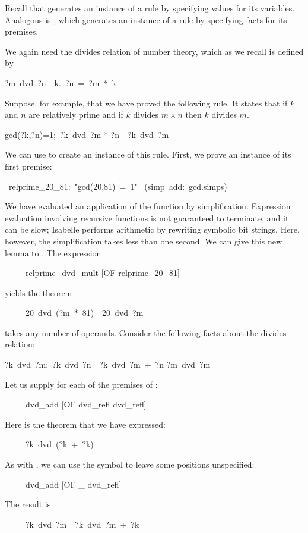 %
Recall that  generates an instance of a
rule by specifying values for its variables.  Analogous is , which
generates an instance of a rule by specifying facts for its premises.  

We again need the divides relation of number theory, which
as we recall is defined by 
\begin{isabelle}
?m\ dvd\ ?n\ \isasymequiv\ {\isasymexists}k.\ ?n\ =\ ?m\ *\ k
\end{isabelle}
%
Suppose, for example, that we have proved the following rule.  
It states that if $k$ and $n$ are relatively prime
and if $k$ divides $m\times n$ then $k$ divides $m$.
\begin{isabelle}
\isasymlbrakk gcd(?k,?n){=}1;\ ?k\ dvd\ ?m * ?n\isasymrbrakk\
\isasymLongrightarrow\ ?k\ dvd\ ?m
\end{isabelle}
We can use  to create an instance of this rule.
First, we
prove an instance of its first premise:
\begin{isabelle}
\ relprime_20_81:\ "gcd(20,81)\ =\ 1"\isanewline
\isacommand{by}\ (simp\ add:\ gcd.simps)
\end{isabelle}
We have evaluated an application of the  function by
simplification.  Expression evaluation involving recursive functions is not
guaranteed to terminate, and it can be slow; Isabelle
performs arithmetic by  rewriting symbolic bit strings.  Here,
however, the simplification takes less than one second.  We can
give this new lemma to .  The expression
\begin{isabelle}
\ \ \ \ \ relprime_dvd_mult [OF relprime_20_81]
\end{isabelle}
yields the theorem
\begin{isabelle}
\ \ \ \ \ 20\ dvd\ (?m\ *\ 81)\ \isasymLongrightarrow\ 20\ dvd\ ?m%
\end{isabelle}
%
 takes any number of operands.  Consider 
the following facts about the divides relation: 
\begin{isabelle}
\isasymlbrakk?k\ dvd\ ?m;\
?k\ dvd\ ?n\isasymrbrakk\
\isasymLongrightarrow\ ?k\ dvd\
?m\ +\ ?n
\rulename{dvd_add}\isanewline
?m\ dvd\ ?m%
\rulename{dvd_refl}
\end{isabelle}
Let us supply \isa{dvd_refl} for each of the premises of :
\begin{isabelle}
\ \ \ \ \ dvd_add [OF dvd_refl dvd_refl]
\end{isabelle}
Here is the theorem that we have expressed: 
\begin{isabelle}
\ \ \ \ \ ?k\ dvd\ (?k\ +\ ?k)
\end{isabelle}
As with \isa{of}, we can use the \isa{_} symbol to leave some positions
unspecified:
\begin{isabelle}
\ \ \ \ \ dvd_add [OF _ dvd_refl]
\end{isabelle}
The result is 
\begin{isabelle}
\ \ \ \ \ ?k\ dvd\ ?m\ \isasymLongrightarrow\ ?k\ dvd\ ?m\ +\ ?k
\end{isabelle}

